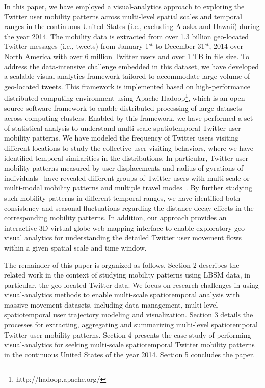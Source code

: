 \documentclass[ijgi,article,accept,moreauthors,pdftex,10pt,a4paper]{mdpi}
\theoremstyle{mdpi}
\newcounter{ex}
\newcounter{re}
\theoremstyle{mdpidefinition}
\begin{document}
In this paper, we have employed a visual-analytics approach to exploring the Twitter user mobility patterns across multi-level spatial scales and temporal ranges in the continuous United States (i.e., excluding Alaska and Hawaii) during the year 2014.
The mobility data is extracted from over 1.3 billion geo-located Twitter messages (i.e., tweets) from January 1$^{st}$ to December 31$^{st}$, 2014 over North America with over 6 million Twitter users and over 1 TB in file size.
To address the data-intensive challenge embedded in this dataset, we have developed a scalable visual-analytics framework tailored to accommodate large volume of geo-located tweets.
This framework is implemented based on high-performance distributed computing environment using Apache Hadoop\footnote{http://hadoop.apache.org/}, which is an open source software framework to enable distributed processing of large datasets across computing clusters.
Enabled by this framework, we have performed a set of statistical analysis to understand multi-scale spatiotemporal Twitter user mobility patterns. 
We have modeled the frequency of Twitter users visiting different locations to study the collective user visiting behaviors, where we have identified temporal similarities in the distributions.
In particular, Twitter user mobility patterns measured by user displacements and radius of gyrations of individuals~\cite{gonzalez2008understanding} have revealed different groups of Twitter users with multi-scale or multi-modal mobility patterns and multiple travel modes~\cite{Jurdak2015}.
By further studying such mobility patterns in different temporal ranges, we have identified both consistency and seasonal fluctuations regarding the distance decay effects in the corresponding mobility patterns.
In addition, our approach provides an interactive 3D virtual globe web mapping interface to enable exploratory geo-visual analytics for understanding the detailed Twitter user movement flows within a given spatial scale and time window.

The remainder of this paper is organized as follows.
Section 2 describes the related work in the context of studying mobility patterns using LBSM data, in particular, the geo-located Twitter data.
We focus on research challenges in using visual-analytics methods to enable multi-scale spatiotemporal analysis with massive movement datasets, including data management, multi-level spatiotemporal user trajectory modeling and visualization.
Section 3 details the processes for extracting, aggregating and summarizing multi-level spatiotemporal Twitter user mobility patterns.
Section 4 presents the case study of performing visual-analytics for seeking multi-scale spatiotemporal Twitter mobility patterns in the continuous United States of the year 2014.
Section 5 concludes the paper.
\end{document}
